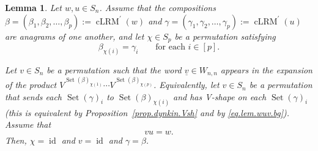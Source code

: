 \documentclass[submission]{FPSAC2026}
\newtheorem{lem}{Lemma}
\newcommand{\id}{\operatorname{id}} %
\begin{document}
\begin{lem}
\label{lem.wuv}Let $w,u\in S_{n}$. Assume that the compositions $\beta=\left(
\beta_{1},\beta_{2},\ldots,\beta_{p}\right)  :=\operatorname{cLRM}^{\prime
}(w)$ and $\gamma=\left(  \gamma_{1},\gamma_{2},\ldots,\gamma_{p}\right)
:=\operatorname{cLRM}^{\prime}(u)$ are anagrams of one another, and let
$\chi\in S_{p}$ be a permutation satisfying%
\begin{equation}
\beta_{\chi\left(  i\right)  }=\gamma_{i}\qquad\text{for each }i\in\left[
p\right]  .
\label{eq.lem.wuv.bg}
\end{equation}

Let $v\in S_{n}$ be a permutation such that the word $\underline{v}\in
W_{n,n}$ appears in the expansion of the product $V^{\operatorname{Set}%
(\beta)_{\chi(1)}}\cdots V^{\operatorname{Set}(\beta)_{\chi(p)}}$.
Equivalently, let
$v\in S_{n}$ be a permutation that sends each $\operatorname*{Set}\left(
\gamma\right)  _{i}$ to $\operatorname*{Set}\left(  \beta\right)
_{\chi\left(  i\right)  }$ and has V-shape on each $\operatorname*{Set}\left(
\gamma\right)  _{i}$
(this is equivalent by Proposition~\ref{prop.dynkin.Vsh} and by
\eqref{eq.lem.wuv.bg}). Assume that
\[
vu=w.
\]
Then, $\chi= \id $ and $v= \id $ and $\gamma=\beta$.
\end{lem}
\end{document}
